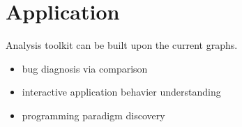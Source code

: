\section {Application}
Analysis toolkit can be built upon the current graphs.
\begin {itemize}
\item bug diagnosis via comparison
\item interactive application behavier understanding
\item programming paradigm discovery
\end {itemize}
